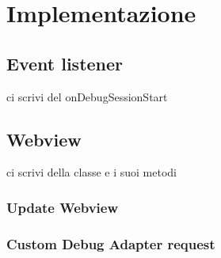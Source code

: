 \chapter{Implementazione}
\section{Event listener}
ci scrivi del onDebugSessionStart

\section{Webview}
ci scrivi della classe e i suoi metodi
\subsection{Update Webview}
\subsection{Custom Debug Adapter request}
